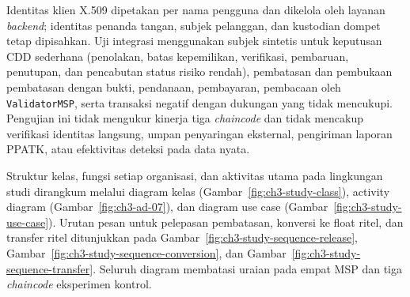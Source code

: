 Identitas klien X.509 dipetakan per nama pengguna dan dikelola oleh layanan
\textit{backend}; identitas penanda tangan, subjek pelanggan, dan kustodian
dompet tetap dipisahkan. Uji integrasi menggunakan subjek sintetis untuk
keputusan CDD sederhana (penolakan, batas kepemilikan, verifikasi, pembaruan, penutupan, dan pencabutan status risiko rendah),
pembatasan dan pembukaan
pembatasan dengan bukti, pendanaan, pembayaran, pembacaan oleh
\texttt{ValidatorMSP}, serta transaksi negatif dengan dukungan yang tidak
mencukupi. Pengujian ini tidak mengukur kinerja tiga \textit{chaincode} dan
tidak mencakup verifikasi identitas langsung, umpan penyaringan eksternal,
pengiriman laporan PPATK, atau efektivitas deteksi pada data nyata.

Struktur kelas, fungsi setiap organisasi, dan aktivitas utama pada lingkungan
studi dirangkum melalui diagram kelas (Gambar~\ref{fig:ch3-study-class}),
activity diagram (Gambar~\ref{fig:ch3-ad-07}), dan diagram use case
(Gambar~\ref{fig:ch3-study-use-case}). Urutan pesan untuk pelepasan
pembatasan, konversi ke float ritel, dan transfer ritel ditunjukkan pada
Gambar~\ref{fig:ch3-study-sequence-release},
Gambar~\ref{fig:ch3-study-sequence-conversion}, dan
Gambar~\ref{fig:ch3-study-sequence-transfer}. Seluruh diagram membatasi uraian
pada empat MSP dan tiga \textit{chaincode} eksperimen kontrol.






